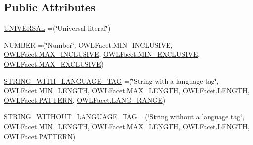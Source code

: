 \subsection*{Public Attributes}
\begin{DoxyCompactItemize}
\item 
\hyperlink{enumorg_1_1semanticweb_1_1owlapi_1_1vocab_1_1_o_w_l2_datatype_1_1_category_ace75c06d32c80b721b09d6835a1a3432}{U\-N\-I\-V\-E\-R\-S\-A\-L} =(\char`\"{}Universal literal\char`\"{})
\item 
\hyperlink{enumorg_1_1semanticweb_1_1owlapi_1_1vocab_1_1_o_w_l2_datatype_1_1_category_a97ce57869179b750ad9ff9751e8f96b4}{N\-U\-M\-B\-E\-R} =(\char`\"{}Number\char`\"{}, O\-W\-L\-Facet.\-M\-I\-N\-\_\-\-I\-N\-C\-L\-U\-S\-I\-V\-E, \hyperlink{enumorg_1_1semanticweb_1_1owlapi_1_1vocab_1_1_o_w_l_facet_ac9a64ef90c0effd4c743c76c93dc7a6f}{O\-W\-L\-Facet.\-M\-A\-X\-\_\-\-I\-N\-C\-L\-U\-S\-I\-V\-E}, \hyperlink{enumorg_1_1semanticweb_1_1owlapi_1_1vocab_1_1_o_w_l_facet_a27c52fbbfdcc423521b725bc8a2dc949}{O\-W\-L\-Facet.\-M\-I\-N\-\_\-\-E\-X\-C\-L\-U\-S\-I\-V\-E}, \hyperlink{enumorg_1_1semanticweb_1_1owlapi_1_1vocab_1_1_o_w_l_facet_aeb6a9174b60549039a19540cae7d3525}{O\-W\-L\-Facet.\-M\-A\-X\-\_\-\-E\-X\-C\-L\-U\-S\-I\-V\-E})
\item 
\hyperlink{enumorg_1_1semanticweb_1_1owlapi_1_1vocab_1_1_o_w_l2_datatype_1_1_category_a0f9ce4b1677ed4b3e90c0679e2abefda}{S\-T\-R\-I\-N\-G\-\_\-\-W\-I\-T\-H\-\_\-\-L\-A\-N\-G\-U\-A\-G\-E\-\_\-\-T\-A\-G} =(\char`\"{}String with a language tag\char`\"{}, O\-W\-L\-Facet.\-M\-I\-N\-\_\-\-L\-E\-N\-G\-T\-H, \hyperlink{enumorg_1_1semanticweb_1_1owlapi_1_1vocab_1_1_o_w_l_facet_ad14fff0cda2f326a486b922076016d19}{O\-W\-L\-Facet.\-M\-A\-X\-\_\-\-L\-E\-N\-G\-T\-H}, \hyperlink{enumorg_1_1semanticweb_1_1owlapi_1_1vocab_1_1_o_w_l_facet_a94848a88879ba59175ec96c477ca9ae2}{O\-W\-L\-Facet.\-L\-E\-N\-G\-T\-H}, \hyperlink{enumorg_1_1semanticweb_1_1owlapi_1_1vocab_1_1_o_w_l_facet_aac44b7eb7db8e6f75fccbfea32296169}{O\-W\-L\-Facet.\-P\-A\-T\-T\-E\-R\-N}, \hyperlink{enumorg_1_1semanticweb_1_1owlapi_1_1vocab_1_1_o_w_l_facet_a18ba4fd7c449c54c53347fc0a45232e8}{O\-W\-L\-Facet.\-L\-A\-N\-G\-\_\-\-R\-A\-N\-G\-E})
\item 
\hyperlink{enumorg_1_1semanticweb_1_1owlapi_1_1vocab_1_1_o_w_l2_datatype_1_1_category_a44f9e4681f05aa129189fc174186298a}{S\-T\-R\-I\-N\-G\-\_\-\-W\-I\-T\-H\-O\-U\-T\-\_\-\-L\-A\-N\-G\-U\-A\-G\-E\-\_\-\-T\-A\-G} =(\char`\"{}String without a language tag\char`\"{}, O\-W\-L\-Facet.\-M\-I\-N\-\_\-\-L\-E\-N\-G\-T\-H, \hyperlink{enumorg_1_1semanticweb_1_1owlapi_1_1vocab_1_1_o_w_l_facet_ad14fff0cda2f326a486b922076016d19}{O\-W\-L\-Facet.\-M\-A\-X\-\_\-\-L\-E\-N\-G\-T\-H}, \hyperlink{enumorg_1_1semanticweb_1_1owlapi_1_1vocab_1_1_o_w_l_facet_a94848a88879ba59175ec96c477ca9ae2}{O\-W\-L\-Facet.\-L\-E\-N\-G\-T\-H}, \hyperlink{enumorg_1_1semanticweb_1_1owlapi_1_1vocab_1_1_o_w_l_facet_aac44b7eb7db8e6f75fccbfea32296169}{O\-W\-L\-Facet.\-P\-A\-T\-T\-E\-R\-N})

\end{DoxyCompactItemize}
